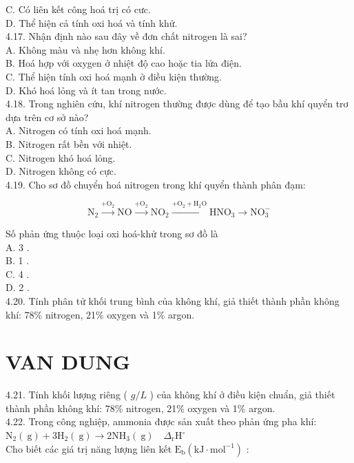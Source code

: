 \documentclass[10pt]{article}
\begin{document}
C. Có liên kết công hoá trị có cưc.\\
D. Thể hiện cả tính oxi hoá và tính khử.\\
4.17. Nhận định nào sau đây về đơn chất nitrogen là sai?\\
A. Không màu và nhẹ hơn không khí.\\
B. Hoá hợp với oxygen ở nhiệt độ cao hoặc tia lửa điện.\\
C. Thể hiện tính oxi hoá mạnh ở điều kiện thường.\\
D. Khó hoá lỏng và ít tan trong nước.\\
4.18. Trong nghiên cứu, khí nitrogen thường được dùng để tạo bầu khí quyển trơ dựa trên cơ sở nào?\\
A. Nitrogen có tính oxi hoá mạnh.\\
B. Nitrogen rất bền với nhiệt.\\
C. Nitrogen khó hoá lỏng.\\
D. Nitrogen không có cực.\\
4.19. Cho sơ đồ chuyển hoá nitrogen trong khí quyển thành phân đạm:

$$
\mathrm{N}_{2} \xrightarrow{+\mathrm{O}_{2}} \mathrm{NO} \xrightarrow{+\mathrm{O}_{2}} \mathrm{NO}_{2} \xrightarrow{+\mathrm{O}_{2}+\mathrm{H}_{2} \mathrm{O}} \mathrm{HNO}_{3} \longrightarrow \mathrm{NO}_{3}^{-}
$$

Số phản ứng thuộc loại oxi hoá-khử trong sơ đồ là\\
A. 3 .\\
B. 1 .\\
C. 4 .\\
D. 2 .\\
4.20. Tính phân tử khối trung bình của không khí, giả thiết thành phần không khí: 78\% nitrogen, 21\% oxygen và 1\% argon.

\section*{VAN DUNG}
4.21. Tính khối lượng riêng ( $g / L$ ) của không khí ở điều kiện chuẩn, giả thiết thành phần không khí: 78\% nitrogen, 21\% oxygen và 1\% argon.\\
4.22. Trong công nghiệp, ammonia được sản xuất theo phản ứng pha khí:\\
$\mathrm{N}_{2}(\mathrm{~g})+3 \mathrm{H}_{2}(\mathrm{~g}) \longrightarrow 2 \mathrm{NH}_{3}(\mathrm{~g}) \quad \Delta_{\mathrm{r}} \mathrm{H}^{\circ}$\\
Cho biết các giá trị năng lượng liên kết $\mathrm{E}_{\mathrm{b}}\left(\mathrm{kJ} \cdot \mathrm{mol}^{-1}\right)$ :
\end{document}
